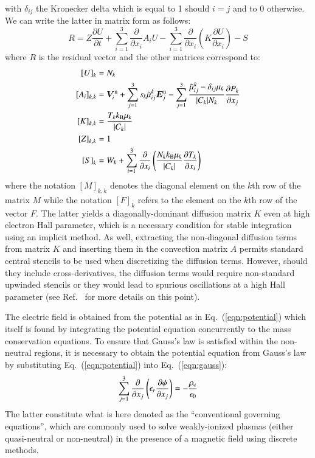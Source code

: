 \documentclass{warpdoc}
\newcommand{\alb}{\vspace{0.1cm}\\} %
\newcommand{\nd}{3}
\renewcommand{\vec}[1]{\bm{#1}}
\begin{document}
%
with $\delta_{ij}$ the Kronecker delta which is equal to 1 should $i=j$ and to 0 otherwise. We can write the latter in matrix form as follows:
%
\begin{equation}
 R = Z \frac{\partial U}{\partial t} + \sum_{i=1}^3 \frac{\partial}{\partial x_i} A_i U  - \sum_{i=1}^3  \frac{\partial}{\partial x_i}  \left( K \frac{\partial U}{\partial x_i}\right)  -S
\end{equation}
%
where $R$ is the residual vector and the other matrices correspond to:
%
\begin{align}
 \left[U\right]_k&=N_k \alb
 \left[A_i\right]_{k,k} &= \vec{V}^{\rm n}_i+\sum_{j=1}^\nd s_k \wtilde{\mu}^k_{ij}  \vec{E}_j^{\rm n}
             - \sum_{j=1}^\nd  \frac{\wtilde{\mu}^{k}_{ij}-\delta_{ij} \mu_k}{|C_k| N_k} \frac{\partial P_k}{\partial x_j}  \alb
 \left[K\right]_{k,k} &= \frac{T_k k_{\rm B} \mu_k}{|C_k|} \alb
 \left[Z\right]_{k,k} &= 1 \alb
 \left[S\right]_k &=W_k+
\sum_{i=1}^3 \frac{\partial}{\partial x_i} \left(\frac{N_k k_{\rm B} \mu_k}{|C_k| } \frac{\partial T_k}{\partial x_i}
\right) 
\end{align}
%
where the notation $[M]_{k,k}$ denotes the diagonal element on the $k$th row of the matrix $M$ while the notation $[F]_k$ refers to the element on the $k$th row of the vector $F$. The latter yields a diagonally-dominant diffusion matrix $K$ even at high electron Hall parameter, which is a necessary condition for stable integration using an implicit method. As well, extracting the non-diagonal diffusion terms from matrix $K$ and inserting them in the convection matrix $A$ permits standard central stencils to be used when discretizing the diffusion terms. However, should they include cross-derivatives, the diffusion terms would require non-standard upwinded stencils or they would lead to spurious oscillations at a high Hall parameter (see Ref.\ \cite{jcp:2011:parent} for more details on this point).   

The electric field is obtained from the potential as in Eq.\ (\ref{eqn:potential}) which itself is found by integrating the potential equation concurrently to the mass conservation equations. To ensure that Gauss's law is satisfied within the non-neutral regions, it is necessary to obtain the potential equation from Gauss's law by substituting Eq.\ (\ref{eqn:potential}) into Eq.\ (\ref{eqn:gauss}):
%
\begin{equation}
\sum_{j=1}^3 \frac{\partial }{\partial x_j}\left(\epsilon_r \frac{\partial \phi}{\partial x_j}\right)=-\frac{\rho_{\rm c}}{\epsilon_0}  
\label{eqn:potentialgauss}
\end{equation}
%  
The latter constitute what is here denoted as the ``conventional governing equations'', which are commonly used to solve weakly-ionized plasmas (either quasi-neutral or non-neutral) in the presence of a magnetic field using discrete methods.
\end{document}
